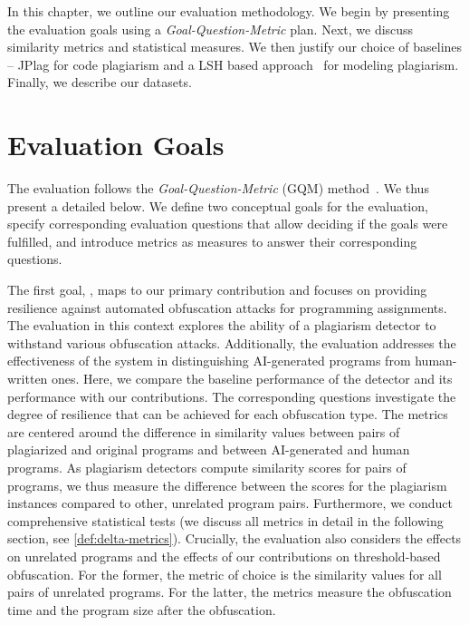 In this chapter, we outline our evaluation methodology. We begin by presenting the evaluation goals using a \textit{Goal-Question-Metric} plan. Next, we discuss similarity metrics and statistical measures. We then justify our choice of baselines -- JPlag for code plagiarism and a \ac{LSH} based approach~\cite{Martinez2020} for modeling plagiarism. Finally, we describe our datasets.


\section{Evaluation Goals}
The evaluation follows the \textit{Goal-Question-Metric} (GQM) method~\cite{Basili1984, Basili1992}. We thus present a detailed \gqm{} below. We define two conceptual goals for the evaluation, specify corresponding evaluation questions that allow deciding if the goals were fulfilled, and introduce metrics as measures to answer their corresponding questions.

The first goal, , maps to our primary contribution  and focuses on providing resilience against automated obfuscation attacks for programming assignments. The evaluation in this context explores the ability of a plagiarism detector to withstand various obfuscation attacks. Additionally, the evaluation addresses the effectiveness of the system in distinguishing AI-generated programs from human-written ones.
Here, we compare the baseline performance of the detector and its performance with our contributions.
The corresponding questions investigate the degree of resilience that can be achieved for each obfuscation type. The metrics are centered around the difference in similarity values between pairs of plagiarized and original programs and between AI-generated and human programs. 
%
As plagiarism detectors compute similarity scores for pairs of programs, we thus measure the difference between the scores for the plagiarism instances compared to other, unrelated program pairs.
%
Furthermore, we conduct comprehensive statistical tests (we discuss all metrics in detail in the following section, see \autoref{def:delta-metrics}).
%
Crucially, the evaluation also considers the effects on unrelated programs and the effects of our contributions on threshold-based obfuscation. For the former, the metric of choice is the similarity values for all pairs of unrelated programs.
For the latter, the metrics measure the obfuscation time and the program size after the obfuscation.

